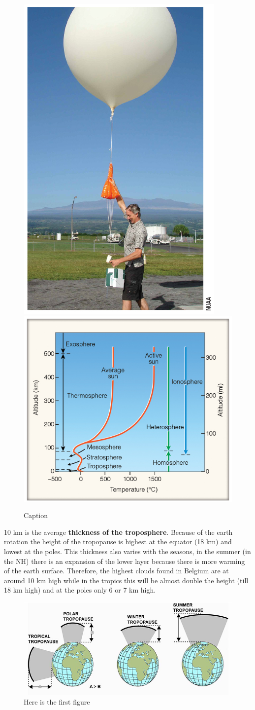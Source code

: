 \documentclass[oneside]{book}
\begin{document}
\begin{figure}

{\centering \includegraphics[width=0.4\linewidth]{figures/Figure14a} \includegraphics[width=0.4\linewidth]{figures/Figure14b} 

}

\caption{Caption}\label{fig:Homosphere}
\end{figure}

10 km is the average \textbf{thickness of the troposphere}. Because of
the earth rotation the height of the tropopause is highest at the
equator (18 km) and lowest at the poles. This thickness also varies with
the seasons, in the summer (in the NH) there is an expansion of the
lower layer because there is more warming of the earth surface.
Therefore, the highest clouds found in Belgium are at around 10 km high
while in the tropics this will be almost double the height (till 18 km
high) and at the poles only 6 or 7 km high.

\begin{figure}

{\centering \includegraphics[width=0.5\linewidth]{figures/Figure15} 

}

\caption{Here is the first figure}\label{fig:Thickness}
\end{figure}
\end{document}

